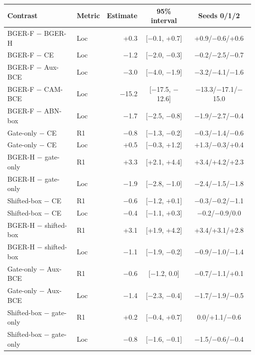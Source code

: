 \begingroup
\captionsetup{type=table}\centering\footnotesize\setlength{\tabcolsep}{4pt}
\caption{Complete exploratory hook/control contrasts (pp). Basic 95\% intervals from 10,000 shared query-identity cluster draws; conditional on trained models and fixed gallery, unadjusted and not simultaneous. No confirmatory $p$-values. R1: Recall@1; Loc: query-logo localization. Seeds list paired differences.}
\label{tab:posthoc-all}\begin{tabular}{llrcc}\toprule Contrast & Metric & Estimate & 95\% interval & Seeds 0/1/2\\\midrule
BGER-F $-$ BGER-H & Loc & +0.3 & [$-$0.1, +0.7] & +0.9/$-$0.6/+0.6\\
BGER-F $-$ CE & Loc & $-$1.2 & [$-$2.0, $-$0.3] & $-$0.2/$-$2.5/$-$0.7\\
BGER-F $-$ Aux-BCE & Loc & $-$3.0 & [$-$4.0, $-$1.9] & $-$3.2/$-$4.1/$-$1.6\\
BGER-F $-$ CAM-BCE & Loc & $-$15.2 & [$-$17.5, $-$12.6] & $-$13.3/$-$17.1/$-$15.0\\
BGER-F $-$ ABN-box & Loc & $-$1.7 & [$-$2.5, $-$0.8] & $-$1.9/$-$2.7/$-$0.4\\
Gate-only $-$ CE & R1 & $-$0.8 & [$-$1.3, $-$0.2] & $-$0.3/$-$1.4/$-$0.6\\
Gate-only $-$ CE & Loc & +0.5 & [$-$0.3, +1.2] & +1.3/$-$0.3/+0.4\\
BGER-H $-$ gate-only & R1 & +3.3 & [+2.1, +4.4] & +3.4/+4.2/+2.3\\
BGER-H $-$ gate-only & Loc & $-$1.9 & [$-$2.8, $-$1.0] & $-$2.4/$-$1.5/$-$1.8\\
Shifted-box $-$ CE & R1 & $-$0.6 & [$-$1.2, +0.1] & $-$0.3/$-$0.2/$-$1.1\\
Shifted-box $-$ CE & Loc & $-$0.4 & [$-$1.1, +0.3] & $-$0.2/$-$0.9/0.0\\
BGER-H $-$ shifted-box & R1 & +3.1 & [+1.9, +4.2] & +3.4/+3.1/+2.8\\
BGER-H $-$ shifted-box & Loc & $-$1.1 & [$-$1.9, $-$0.2] & $-$0.9/$-$1.0/$-$1.4\\
Gate-only $-$ Aux-BCE & R1 & $-$0.6 & [$-$1.2, 0.0] & $-$0.7/$-$1.1/+0.1\\
Gate-only $-$ Aux-BCE & Loc & $-$1.4 & [$-$2.3, $-$0.4] & $-$1.7/$-$1.9/$-$0.5\\
Shifted-box $-$ gate-only & R1 & +0.2 & [$-$0.4, +0.7] & 0.0/+1.1/$-$0.6\\
Shifted-box $-$ gate-only & Loc & $-$0.8 & [$-$1.6, $-$0.1] & $-$1.5/$-$0.6/$-$0.4\\
\bottomrule\end{tabular}\par
\endgroup
